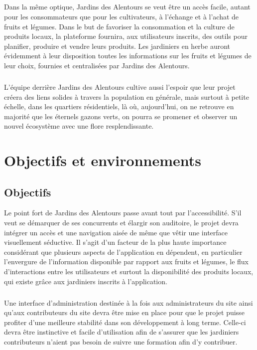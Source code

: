 \documentclass{scrreprt}
\def\projectname{Jardins des Alentours}
\begin{document}
\paragraph{}
Dans la même optique, \projectname{} se veut être un accès facile, autant
pour les consommateurs que pour les cultivateurs, à l'échange et à l'achat de fruits et légumes.
Dans le but de favoriser la consommation et la culture de produits locaux, la plateforme fournira,
aux utilisateurs inscrits, des outils pour planifier, produire et vendre leurs produits. Les jardiniers
en herbe auront évidemment à leur disposition toutes les informations sur les fruits et légumes de
leur choix, fournies et centralisées par \projectname{}.

\paragraph{}
L'équipe derrière \projectname{} cultive aussi l'espoir que leur projet
créera des liens solides à travers la population en générale, mais surtout à
petite échelle, dans les quartiers résidentiels, là où, aujourd'hui, on ne retrouve
en majorité que les éternels gazons verts, on pourra se promener et observer
un nouvel écosystème avec une flore resplendissante.

\chapter{Objectifs et environnements}
\section{Objectifs}
Le point fort de \projectname{} passe avant tout par l'accessibilité.
S'il veut se démarquer de ses concurrents et élargir son auditoire, le projet
devra intégrer un accès et une navigation aisée de même que vêtir une interface visuellement séductive.
Il s'agit d'un facteur de la plus haute importance considérant que plusieurs aspects
de l'application en dépendent, en particulier l'envergure de l'information disponible par rapport aux fruits et légumes,
le flux d'interactions entre les utilisateurs et surtout la disponibilité des produits locaux, qui existe grâce aux jardiniers
inscrits à l'application.

\paragraph{}
Une interface d'administration destinée à la fois aux administrateurs du site
ainsi qu'aux contributeurs du site devra être mise en place pour que le projet puisse profiter
d'une meilleure stabilité dans son développement à long terme. Celle-ci devra
être instinctive et facile d'utilisation afin de s'assurer que les jardiniers
contributeurs n'aient pas besoin de suivre une formation afin d'y contribuer.
\end{document}
